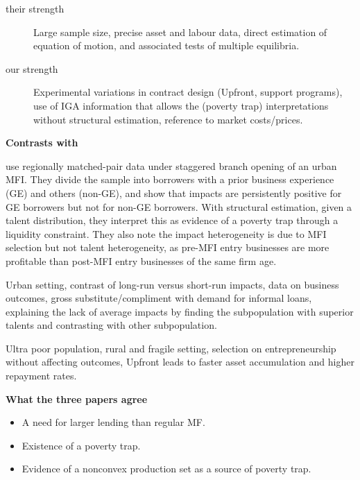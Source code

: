 \begin{description}
\vspace{1.0ex}\setlength{\itemsep}{1.0ex}\setlength{\baselineskip}{12pt}
\item[their strength]	Large sample size, precise asset and labour data, direct estimation of equation of motion, and associated tests of multiple equilibria.
\item[our strength]	Experimental variations in contract design (\textsf{Upfront}, support programs), use of IGA information that allows the (poverty trap) interpretations without structural estimation, reference to market costs/prices. 
\end{description}

\noindent
\textbf{\textbf{Contrasts with \citet{Banerjee2019MFPovertyTrap}}}

	\citet{Banerjee2019MFPovertyTrap} use regionally matched-pair data under staggered branch opening of an urban MFI. They divide the sample into borrowers with a prior business experience (GE) and others (non-GE), and show that impacts are persistently positive for GE borrowers but not for non-GE borrowers. With structural estimation, given a talent distribution, they interpret this as evidence of a poverty trap through a liquidity constraint. They also note the impact heterogeneity is due to MFI selection but not talent heterogeneity, as pre-MFI entry businesses are more profitable than post-MFI entry businesses of the same firm age. 

\begin{description}
\vspace{1.0ex}\setlength{\itemsep}{1.0ex}\setlength{\baselineskip}{12pt}
\item[their strength]	Urban setting, contrast of long-run versus short-run impacts, data on business outcomes, gross substitute/compliment with demand for informal loans, explaining the lack of average impacts by finding the subpopulation with superior talents and contrasting with other subpopulation.
\item[our strength]	Ultra poor population, rural and fragile setting, selection on entrepreneurship without affecting outcomes, \textsf{Upfront} leads to faster asset accumulation and higher repayment rates.
\end{description}

\noindent
\textbf{What the three papers agree}

\begin{itemize}
\vspace{1.0ex}\setlength{\itemsep}{1.0ex}\setlength{\baselineskip}{12pt}
\item	A need for larger lending than regular MF.
\item	Existence of a poverty trap.
\item	Evidence of a nonconvex production set as a source of poverty trap.
\end{itemize}

